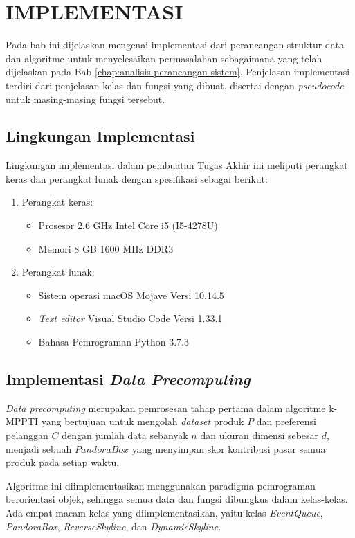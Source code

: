 \chapter{IMPLEMENTASI} \label{chap:implementasi}

\tab Pada bab ini dijelaskan mengenai implementasi dari perancangan struktur data dan algoritme untuk menyelesaikan permasalahan \problemDua{} sebagaimana yang telah dijelaskan pada Bab \ref{chap:analisis-perancangan-sistem}. Penjelasan implementasi terdiri dari penjelasan kelas dan fungsi yang dibuat, disertai dengan \textit{pseudocode} untuk masing-masing fungsi tersebut.

\section{Lingkungan Implementasi}
\tab Lingkungan implementasi dalam pembuatan Tugas Akhir ini meliputi perangkat keras dan perangkat lunak dengan spesifikasi sebagai berikut:

\begin{enumerate}
	\item Perangkat keras:
	\begin{itemize}
		\item Prosesor 2.6 GHz Intel Core i5 (I5-4278U)
		\item Memori 8 GB 1600 MHz DDR3
	\end{itemize}
	\item Perangkat lunak:
	\begin{itemize}
		\item Sistem operasi macOS Mojave Versi 10.14.5
		\item \textit{Text editor} Visual Studio Code Versi 1.33.1
		\item Bahasa Pemrograman Python 3.7.3
	\end{itemize}			
\end{enumerate}

\section{Implementasi \textit{Data Precomputing}}
\tab \textit{Data precomputing} merupakan pemrosesan tahap pertama dalam algoritme k-MPPTI yang bertujuan untuk mengolah \textit{dataset} produk $P$ dan preferensi pelanggan $C$ dengan jumlah data sebanyak $n$ dan ukuran dimensi sebesar $d$, menjadi sebuah $Pandora Box$ yang menyimpan skor kontribusi pasar semua produk pada setiap waktu. 

Algoritme ini diimplementasikan menggunakan paradigma pemrograman berorientasi objek, sehingga semua data dan fungsi dibungkus dalam kelas-kelas. Ada empat macam kelas yang diimplementasikan, yaitu kelas \textit{EventQueue}, \textit{PandoraBox}, \textit{ReverseSkyline}, dan \textit{DynamicSkyline}. 

